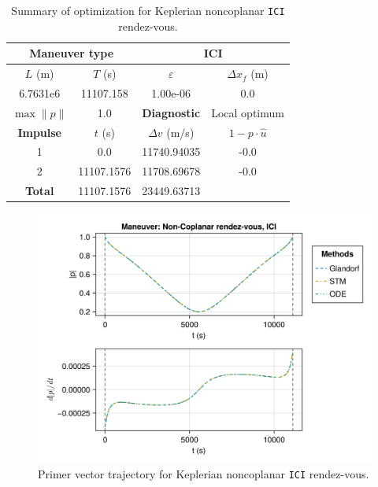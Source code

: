 \begin{table}[htpb]
    \centering
    \begin{tabular}{cccc} \toprule
    \multicolumn{2}{c}{\textbf{Maneuver type}} & \multicolumn{2}{c}{ICI} \\ \midrule
    \(L\) (m) & \(T\) (s) & \(\varepsilon\) & \(\Delta x_{f}\) (m)    \\ \midrule
    6.7631e6          & 11107.158          & 1.00e-06                & 0.0                        \\ \midrule
    \(\max \lVert p \rVert\) & 1.0     & \textbf{Diagnostic}   & Local optimum        \\ \midrule
    \textbf{Impulse} & \(t\) (s) & \(\Delta v\) (m/s) & \(1 - p \cdot \hat{u}\) \\ \midrule
    1                 & 0.0          & 11740.94035             & -0.0                    \\
    2                 & 11107.1576          & 11708.69678             & -0.0                    \\\midrule
    \textbf{Total}   & 11107.1576          & 23449.63713             &                     \\ \bottomrule   
    \end{tabular}
    \caption{Summary of optimization for Keplerian noncoplanar \texttt{ICI} rendez-vous.}
    \label{tab:tb_ncop_ICI_tab}
\end{table}

\begin{figure}[htbp]
    \centering
    \includegraphics[width=\linewidth]{../results/two_body/ipv_noncop/ICI_primer_vector.png}
    \caption{Primer vector trajectory for Keplerian noncoplanar \texttt{ICI} rendez-vous.}
    \label{fig:tb_ncop_ICI_pv}
\end{figure}


